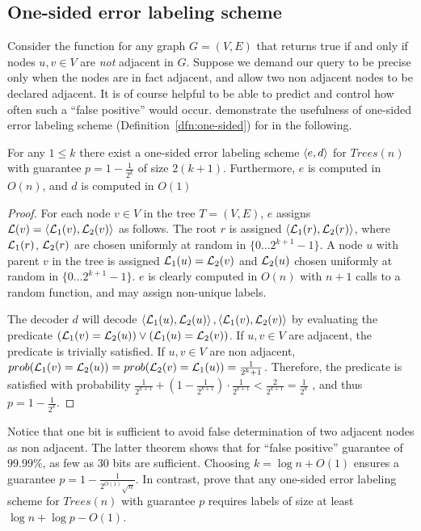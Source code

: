 \subsection{One-sided error \adjacency labeling scheme}\label{sec-adj-onesided}
		Consider the function \nonadjacency  for any graph $G= (V,E)$ that returns true if and only if  nodes $u,v \in V$   are \emph{not} adjacent in $G$.
		Suppose we  demand  our query to be precise only  when the nodes are in fact adjacent, and allow two non adjacent nodes to be declared adjacent.
		It is of course helpful to be able to predict and control how often such a ``false positive'' would occur.
		\cite{fraigniaud2009} demonstrate the usefulness  of one-sided error labeling scheme (Definition~\ref{dfn:one-sided}) for \adjacency in the following.	
			\begin{theorem}
			For any $1 \leq k $ there exist a one-sided error \nonadjacency labeling scheme  $\left \langle e,d \right \rangle $  for $Trees(n)$ with guarantee $p = 1- \frac{1}{2^k}$ of size $2(k+1)$.
			Furthermore, $e$ is computed in $O(n)$, and $d$ is computed in $O(1)$
			\end{theorem}
			\begin{proof}
			For each node $v \in V$ in the tree $T=(V,E)$, $e$ assigns  $ \mathcal{L}(v) = \left \langle  \mathcal{L}_1(v), \mathcal{L}_2(v) \right \rangle $  as follows.
			 The root $r$  is assigned $\left \langle  \mathcal{L}_1( r ),  \mathcal{L}_2( r ) \right \rangle $, where $ \mathcal{L}_1( r )$, $ \mathcal{L}_2( r )$ are chosen uniformly at random in  $ \{0 \dots 2^{k+1}-1 \}$. 
			A node $u$ with parent $v$ in the tree is assigned $ \mathcal{L}_1(u) =  \mathcal{L}_2( v )$ and $ \mathcal{L}_2( u )$ chosen uniformly at random in  $ \{0 \dots 2^{k+1}-1 \}$. 
			 $e$ is clearly computed in $O(n)$ with $n+1$ calls to a random function, and may assign non-unique labels.
			 
			 The decoder $d$ will decode $ \left \langle  \mathcal{L}_1( u ) ,  \mathcal{L}_2( u ) \right \rangle ,\left \langle  \mathcal{L}_1( v ) ,  \mathcal{L}_2( v ) \right \rangle $  by evaluating  the predicate  $( \mathcal{L}_1( v ) =   \mathcal{L}_2(u))  \vee  ( \mathcal{L}_1( u) =   \mathcal{L}_2(v)) $.	
			  If $u,v \in V$  are  adjacent, the predicate is trivially  satisfied.
			 If $u,v \in V$  are  non adjacent, $prob( \mathcal{L}_1( v ) =   \mathcal{L}_2(u)) = prob( \mathcal{L}_2( v) =   \mathcal{L}_1(u)) = \frac{1}{2^k+1}$.
			 Therefore, the predicate is satisfied with probability
			  $\frac{1}{2^{k+1}} + (1 - \frac{1}{2^{k+1}})\cdot \frac{1}{2^{k+1}} < \frac{2}{2^{k+1}} = \frac{1}{2^k}  $
			  , and thus $p = 1-\frac{1}{2^k}$.	
			  \end{proof}
			Notice that one bit is sufficient to avoid  false determination of two  adjacent nodes as  non adjacent.
			The latter theorem shows that for ``false positive''  guarantee of   $99.99\%$, as few as 30 bits are sufficient.
			Choosing  $k= \log n+O(1)$  ensures  a guarantee   $p = 1-\frac{1}{2^{O(1)} \sqrt{n}}$. In contrast,  prove that any  one-sided error  \adjacency labeling scheme for $Trees(n)$  with guarantee $p$ requires labels of  size at least  $\log n + \log p - O(1)$. 